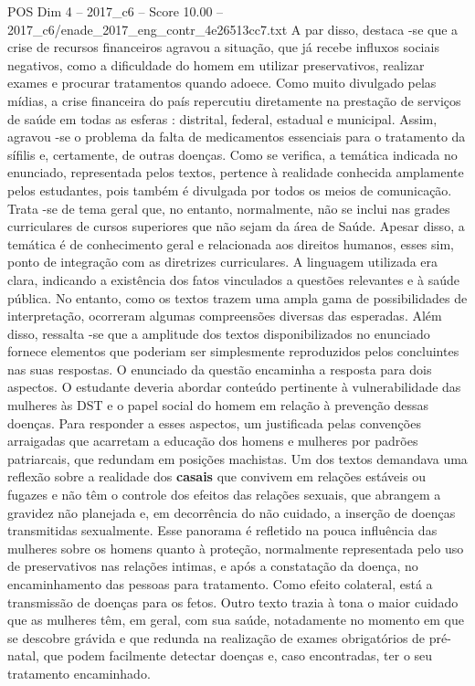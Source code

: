 \begin{textsample}{POS Dim 4 – 2017\_c6 – Score 10.00 – 2017\_c6/enade\_2017\_eng\_contr\_4e26513cc7.txt}
A par disso, destaca -se que a crise de recursos financeiros agravou a situação, que já recebe influxos sociais negativos, como a dificuldade do homem em utilizar preservativos, realizar exames e procurar tratamentos quando adoece.
Como muito divulgado pelas mídias, a crise financeira do país repercutiu diretamente na prestação de serviços de saúde em todas as esferas : distrital, federal, estadual e municipal.
Assim, agravou -se o problema da falta de medicamentos essenciais para o tratamento da sífilis e, certamente, de outras doenças.
Como se verifica, a temática indicada no enunciado, representada pelos textos, pertence à realidade conhecida amplamente pelos estudantes, pois também é divulgada por todos os meios de comunicação.
Trata -se de tema geral que, no entanto, normalmente, não se inclui nas grades curriculares de cursos superiores que não sejam da área de Saúde.
Apesar disso, a temática é de conhecimento geral e relacionada aos direitos humanos, esses sim, ponto de integração com as diretrizes curriculares.
A linguagem utilizada era clara, indicando a existência dos fatos vinculados a questões relevantes e à saúde pública.
No entanto, como os textos trazem uma ampla gama de possibilidades de interpretação, ocorreram algumas compreensões diversas das esperadas.
Além disso, ressalta -se que a amplitude dos textos disponibilizados no enunciado fornece elementos que poderiam ser simplesmente reproduzidos pelos concluintes nas suas respostas.
O enunciado da questão encaminha a resposta para dois aspectos.
O estudante deveria abordar conteúdo pertinente à vulnerabilidade das mulheres às DST e o papel social do homem em relação à prevenção dessas doenças.
Para responder a esses aspectos, um justificada pelas convenções arraigadas que acarretam a educação dos homens e mulheres por padrões patriarcais, que redundam em posições machistas.
Um dos textos demandava uma reflexão sobre a realidade dos \textbf{casais} que convivem em relações estáveis ou fugazes e não têm o controle dos efeitos das relações sexuais, que abrangem a gravidez não planejada e, em decorrência do não cuidado, a inserção de doenças transmitidas sexualmente.
Esse panorama é refletido na pouca influência das mulheres sobre os homens quanto à proteção, normalmente representada pelo uso de preservativos nas relações intimas, e após a constatação da doença, no encaminhamento das pessoas para tratamento.
Como efeito colateral, está a transmissão de doenças para os fetos.
Outro texto trazia à tona o maior cuidado que as mulheres têm, em geral, com sua saúde, notadamente no momento em que se descobre grávida e que redunda na realização de exames obrigatórios de pré-natal, que podem facilmente detectar doenças e, caso encontradas, ter o seu tratamento encaminhado.

\end{textsample}
